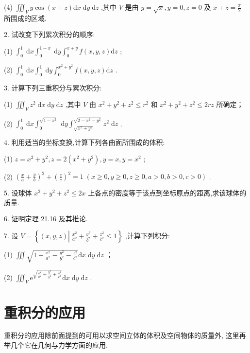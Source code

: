 (4) \({\iiint }_{V}y\cos \left( {x + z}\right) \mathrm{d}x\mathrm{\;d}y\mathrm{\;d}z\) ,其中 \(V\) 是由 \(y = \sqrt{x},y = 0,z = 0\) 及 \(x + z = \frac{\pi }{2}\) 所围成的区域.

2. 试改变下列累次积分的顺序:

(1) \({\int }_{0}^{1}\mathrm{\;d}x{\int }_{0}^{1 - x}\mathrm{\;d}y{\int }_{0}^{x + y}f\left( {x,y,z}\right) \mathrm{d}z\) ;

(2) \({\int }_{0}^{1}\mathrm{\;d}x{\int }_{0}^{1}\mathrm{\;d}y{\int }_{0}^{{x}^{2} + {y}^{2}}f\left( {x,y,z}\right) \mathrm{d}z\) .

3. 计算下列三重积分与累次积分:

(1) \({\iiint }_{V}{z}^{2}\mathrm{\;d}x\mathrm{\;d}y\mathrm{\;d}z\) ,其中 \(V\) 由 \({x}^{2} + {y}^{2} + {z}^{2} \leq  {r}^{2}\) 和 \({x}^{2} + {y}^{2} + {z}^{2} \leq  {2rz}\) 所确定；

(2) \({\int }_{0}^{1}\mathrm{\;d}x{\int }_{0}^{\sqrt{1 - {x}^{2}}}\mathrm{\;d}y{\int }_{\sqrt{{x}^{2} + {y}^{2}}}^{\sqrt{2 - {x}^{2} - {y}^{2}}}{z}^{2}\mathrm{\;d}z\) .

4. 利用适当的坐标变换,计算下列各曲面所围成的体积:

(1) \(z = {x}^{2} + {y}^{2},z = 2\left( {{x}^{2} + {y}^{2}}\right) ,y = x,y = {x}^{2}\) ;

(2) \({\left( \frac{x}{a} + \frac{y}{b}\right) }^{2} + {\left( \frac{z}{c}\right) }^{2} = 1\;\left( {x \geq  0,y \geq  0,z \geq  0,a > 0,b > 0,c > 0}\right)\) .

5. 设球体 \({x}^{2} + {y}^{2} + {z}^{2} \leq  {2x}\) 上各点的密度等于该点到坐标原点的距离,求该球体的质量.

6. 证明定理 21.16 及其推论.

7. 设 \(V = \left\{  {\left( {x,y,z}\right) \left| {\;\frac{{x}^{2}}{{a}^{2}} + \frac{{y}^{2}}{{b}^{2}} + \frac{{z}^{2}}{{c}^{2}} \leq  1}\right. }\right\}\) ,计算下列积分:

(1) \(\iiint \sqrt{1 - \frac{{x}^{2}}{{a}^{2}} - \frac{{y}^{2}}{{b}^{2}} - \frac{{z}^{2}}{{c}^{2}}}\mathrm{d}x\mathrm{\;d}y\mathrm{\;d}z\) ；

(2) \({\iiint }_{V}{\mathrm{e}}^{\sqrt{\frac{{x}^{2}}{{a}^{2}} + \frac{{y}^{2}}{{b}^{2}} + \frac{{z}^{2}}{{c}^{2}}}}\mathrm{d}x\mathrm{\;d}y\mathrm{\;d}z\) .

\section{重积分的应用}

重积分的应用除前面提到的可用以求空间立体的体积及空间物体的质量外, 这里再举几个它在几何与力学方面的应用.

